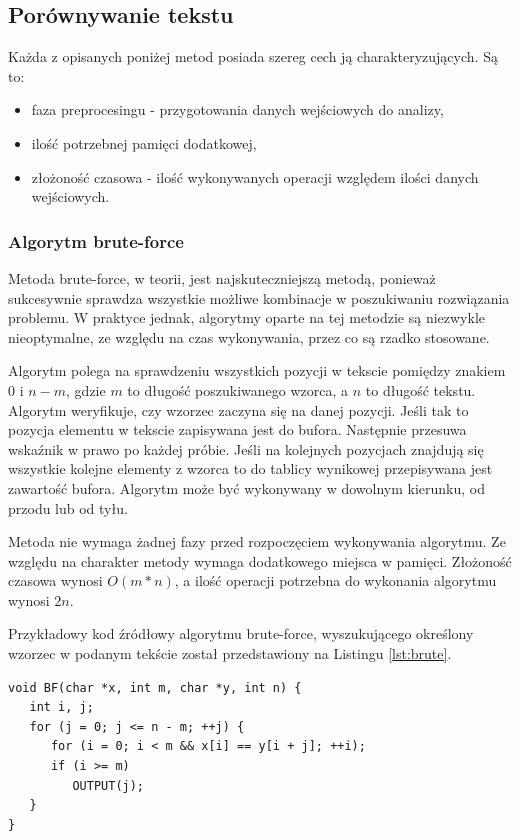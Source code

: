 \documentclass[a4paper,12pt]{article}
\begin{document}
\subsection{Porównywanie tekstu}

Każda z opisanych poniżej metod posiada szereg cech ją charakteryzujących. Są to:
\begin{itemize}
\item faza preprocesingu - przygotowania danych wejściowych do analizy,
\item ilość potrzebnej pamięci dodatkowej,
\item złożoność czasowa - ilość wykonywanych operacji względem ilości danych wejściowych.
\end{itemize}

\subsubsection{Algorytm brute-force}

Metoda brute-force, w teorii, jest najskuteczniejszą metodą, ponieważ sukcesywnie sprawdza wszystkie możliwe kombinacje w poszukiwaniu rozwiązania problemu. W praktyce jednak, algorytmy oparte na tej metodzie są niezwykle nieoptymalne, ze względu na czas wykonywania, przez co są rzadko stosowane.

Algorytm polega na sprawdzeniu wszystkich pozycji w tekscie pomiędzy znakiem $0$ i $n-m$, gdzie $m$ to długość poszukiwanego wzorca, a $n$ to długość tekstu. Algorytm weryfikuje, czy wzorzec zaczyna się na danej pozycji. Jeśli tak to pozycja elementu w tekscie zapisywana jest do bufora. Następnie przesuwa wskaźnik w prawo po każdej próbie. Jeśli na kolejnych pozycjach znajdują się wszystkie kolejne elementy z wzorca to do tablicy wynikowej przepisywana jest zawartość bufora. Algorytm może być wykonywany w dowolnym kierunku, od przodu lub od tyłu.

Metoda nie wymaga żadnej fazy przed rozpoczęciem wykonywania algorytmu. Ze względu na charakter metody wymaga dodatkowego miejsca w pamięci. Złożoność czasowa wynosi $O(m*n)$, a ilość operacji potrzebna do wykonania algorytmu wynosi $2n$.

Przykładowy kod źródłowy algorytmu brute-force, wyszukującego określony wzorzec w podanym tekście został przedstawiony na Listingu \ref{lst:brute}.
\\
\begin{lstlisting}[caption={Przykład implementacji algorytmu brute-force poszukujący wzorca $y$ w tekście $x$.},label={lst:brute}]
void BF(char *x, int m, char *y, int n) {
   int i, j;
   for (j = 0; j <= n - m; ++j) {
      for (i = 0; i < m && x[i] == y[i + j]; ++i);
      if (i >= m)
         OUTPUT(j);
   }
}
\end{lstlisting}
\end{document}
